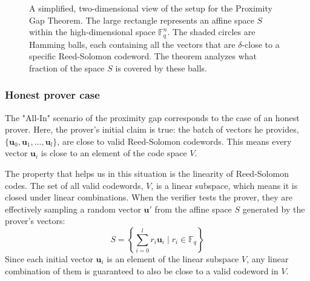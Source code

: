 \documentclass{article}
\begin{document}
\begin{figure}[h!]
{}
\caption{A simplified, two-dimensional view of the setup for the Proximity Gap Theorem. The large rectangle represents an affine space $S$ within the high-dimensional space $\mathbb{F}_q^n$. The shaded circles are Hamming balls, each containing all the vectors that are $\delta$-close to a specific Reed-Solomon codeword. The theorem analyzes what fraction of the space $S$ is covered by these balls.}
\label{fig:proximity_gap_setup}
\end{figure}





\subsubsection{Honest prover case}

The "All-In" scenario of the proximity gap corresponds to the case of an honest prover. Here, the prover's initial claim is true: the batch of vectors he provides, $\{\mathbf{u}_0, \mathbf{u}_1, \dots, \mathbf{u}_l\}$, are close to valid Reed-Solomon codewords. This means every vector $\mathbf{u}_i$ is close to an element of the code space $V$.

The property that helps us in this situation is the linearity of Reed-Solomon codes. The set of all valid codewords, $V$, is a linear subspace, which means it is closed under linear combinations. When the verifier tests the prover, they are effectively sampling a random vector $\mathbf{u}'$ from the affine space $S$ generated by the prover's vectors:
\[ S = \left\{ \sum_{i=0}^{l} r_i \mathbf{u}_i \mid r_i \in \mathbb{F}_q \right\} \]
Since each initial vector $\mathbf{u}_i$ is an element of the linear subspace $V$, any linear combination of them is guaranteed to also be close to a valid codeword in $V$.
\end{document}
